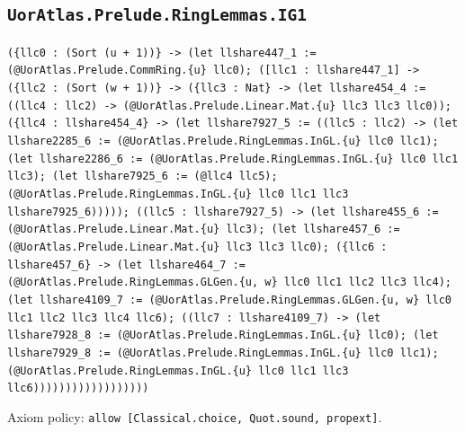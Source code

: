 \documentclass[11pt]{article}
\begin{document}
\subsection*{\texttt{UorAtlas.Prelude.RingLemmas.IG1}}
\noindent\texttt{(\{llc0 : (Sort (u + 1))\} -> (let llshare447\_1 := (@UorAtlas.Prelude.CommRing.\{u\} llc0); ([llc1 : llshare447\_1] -> (\{llc2 : (Sort (w + 1))\} -> (\{llc3 : Nat\} -> (let llshare454\_4 := ((llc4 : llc2) -> (@UorAtlas.Prelude.Linear.Mat.\{u\} llc3 llc3 llc0)); (\{llc4 : llshare454\_4\} -> (let llshare7927\_5 := ((llc5 : llc2) -> (let llshare2285\_6 := (@UorAtlas.Prelude.RingLemmas.InGL.\{u\} llc0 llc1); (let llshare2286\_6 := (@UorAtlas.Prelude.RingLemmas.InGL.\{u\} llc0 llc1 llc3); (let llshare7925\_6 := (@llc4 llc5); (@UorAtlas.Prelude.RingLemmas.InGL.\{u\} llc0 llc1 llc3 llshare7925\_6))))); ((llc5 : llshare7927\_5) -> (let llshare455\_6 := (@UorAtlas.Prelude.Linear.Mat.\{u\} llc3); (let llshare457\_6 := (@UorAtlas.Prelude.Linear.Mat.\{u\} llc3 llc3 llc0); (\{llc6 : llshare457\_6\} -> (let llshare464\_7 := (@UorAtlas.Prelude.RingLemmas.GLGen.\{u, w\} llc0 llc1 llc2 llc3 llc4); (let llshare4109\_7 := (@UorAtlas.Prelude.RingLemmas.GLGen.\{u, w\} llc0 llc1 llc2 llc3 llc4 llc6); ((llc7 : llshare4109\_7) -> (let llshare7928\_8 := (@UorAtlas.Prelude.RingLemmas.InGL.\{u\} llc0); (let llshare7929\_8 := (@UorAtlas.Prelude.RingLemmas.InGL.\{u\} llc0 llc1); (@UorAtlas.Prelude.RingLemmas.InGL.\{u\} llc0 llc1 llc3 llc6))))))))))))))))))}\par
\noindent Axiom policy: \texttt{allow [Classical.choice, Quot.sound, propext]}.\par
\end{document}
